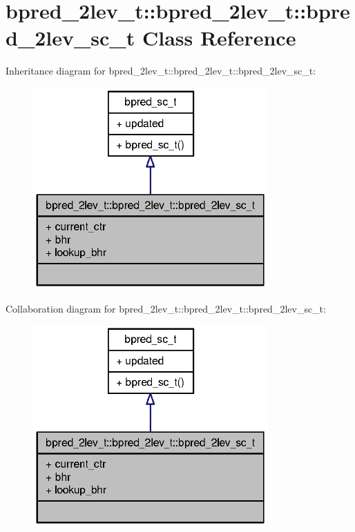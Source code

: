 \section{bpred\_\-2lev\_\-t::bpred\_\-2lev\_\-t::bpred\_\-2lev\_\-sc\_\-t Class Reference}
\label{classbpred__2lev__t_1_1bpred__2lev__sc__t}
Inheritance diagram for bpred\_\-2lev\_\-t::bpred\_\-2lev\_\-t::bpred\_\-2lev\_\-sc\_\-t:\nopagebreak
\begin{figure}[H]
\begin{center}
\leavevmode
\includegraphics[width=254pt]{classbpred__2lev__t_1_1bpred__2lev__sc__t__inherit__graph}
\end{center}
\end{figure}
Collaboration diagram for bpred\_\-2lev\_\-t::bpred\_\-2lev\_\-t::bpred\_\-2lev\_\-sc\_\-t:\nopagebreak
\begin{figure}[H]
\begin{center}
\leavevmode
\includegraphics[width=254pt]{classbpred__2lev__t_1_1bpred__2lev__sc__t__coll__graph}
\end{center}
\end{figure}
